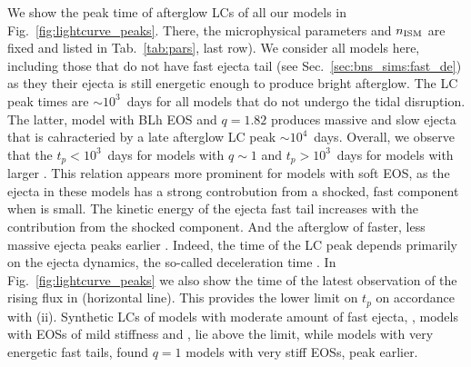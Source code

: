 We show the peak time of afterglow \acp{LC} of all our models in 
Fig.~\ref{fig:lightcurve_peaks}. There, the microphysical parameters and $n_{\text{ISM}}$ are fixed 
and listed in Tab.~\ref{tab:pars}, last row). 
We consider all models here, including those that do not have fast ejecta tail 
(see Sec.~\ref{sec:bns_sims:fast_de}) as they their ejecta is still energetic enough 
to produce bright afterglow. 
%
The \ac{LC} peak times are ${\sim}10^3$~days for all models that do not undergo the 
tidal disruption. The latter, model with BLh \ac{EOS} and $q=1.82$ produces massive and 
slow ejecta that is cahracteried by a late afterglow \ac{LC} peak ${\sim}10^4$~days.
%
Overall, we observe that the $t_{p}<10^3$~days for models with $q\sim1$ and 
$t_p>10^3$~days for models with larger \mr{}. This relation appears more prominent for 
models with soft \ac{EOS}, as the ejecta in these models has a strong controbution from 
a shocked, fast component when \mr{} is small.
The kinetic energy of the ejecta fast tail increases with the contribution from the 
shocked component. And the afterglow of faster, less massive ejecta peaks earlier 
\citep[\eg][]{Hotokezaka:2015eja}.
Indeed, the time of the \ac{LC} peak depends primarily on the ejecta 
dynamics, the so-called deceleration time \citep[\eg][]{Piran:2012wd}.
In Fig.~\ref{fig:lightcurve_peaks} we also show the time of the latest observation 
of the rising flux in \GRB{} (horizontal line). This provides the lower limit on $t_p$
on accordance with (ii).
Synthetic \acp{LC} of models with moderate amount of fast ejecta, \eg, models with 
\acp{EOS} of mild stiffness and \mr{}, lie above the limit, while models with very 
energetic fast tails, found $q=1$ models with very stiff \acp{EOS}, peak earlier. 

